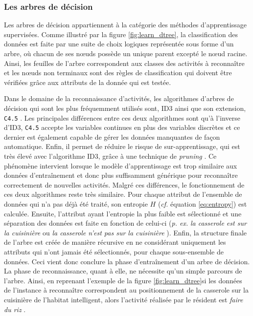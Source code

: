 \subsubsection{Les arbres de décision}

Les arbres de décision appartiennent à la catégorie des méthodes d'apprentissage supervisées. Comme illustré par la figure \ref{fig:learn_dtree}, la classification des données est faite par une suite de choix logiques représentée sous forme d'un arbre, où chacun de ses n\oe{}uds possède un unique parent excepté le n\oe{}ud racine. Ainsi, les feuilles de l'arbre correspondent aux classes des activités à reconnaître et les n\oe{}uds non terminaux sont des règles de classification qui doivent être vérifiées grâce aux attributs de la donnée qui est testée.

Dans le domaine de la reconnaissance d'activités, les algorithmes d'arbres de décision qui sont les plus fréquemment utilisés sont, \ac{ID3} ainsi que son extension, \texttt{C4.5} \citep{QuinlanRoss1993}. Les principales différences entre ces deux algorithmes sont qu'à l'inverse d'\acs{ID3}, \texttt{C4.5} accepte les variables continues en plus des variables discrètes et ce dernier est également capable de gérer les données manquantes de façon automatique. Enfin, il permet de réduire le risque de sur-apprentissage, qui est très élevé avec l'algorithme \acs{ID3}, grâce à une technique de \textit{pruning} \citep{Bao2004, Ravi2005, Tapia2007}. Ce phénomène intervient lorsque le modèle d'apprentissage est trop similaire aux données d'entraînement et donc plus suffisamment générique pour reconnaître correctement de nouvelles activités. Malgré ces différences, le fonctionnement de ces deux algorithmes reste très similaire. Pour chaque attribut de l'ensemble de données qui n'a pas déjà été traité, son entropie $H$ (\textit{cf. } équation \ref{eq:entropy}) est calculée. Ensuite, l'attribut ayant l'entropie la plus faible est sélectionné et une séparation des données est faite en fonction de celui-ci (\textit{p. ex.} \og \textit{la casserole est sur la cuisinière} \fg ou \og \textit{la casserole n'est pas sur la cuisinière} \fg). Enfin, la structure finale de l'arbre est créée de manière récursive en ne considérant uniquement les attributs qui n'ont jamais été sélectionnés, pour chaque sous-ensemble de données. Ceci vient donc conclure la phase d'entraînement d'un arbre de décision. La phase de reconnaissance, quant à elle, ne nécessite qu'un simple parcours de l'arbre. Ainsi, en reprenant l'exemple de la figure \ref{fig:learn_dtree}\textemdash si les données de l'instance à reconnaître correspondent au positionnement de la casserole sur la cuisinière de l'habitat intelligent, alors l'activité réalisée par le résident est \og \textit{faire du riz} \fg.

